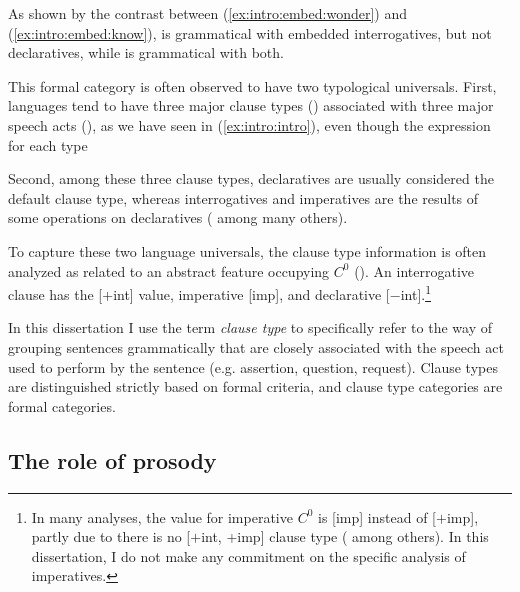 As shown by the contrast between (\ref{ex:intro:embed:wonder}) and (\ref{ex:intro:embed:know}),  is grammatical with embedded interrogatives, but not declaratives, while  is grammatical with both.



This formal category is often observed to have two typological universals. First, languages tend to have three major clause types (\diis{}) associated with three major speech acts (\aqrs{}), as we have seen in (\ref{ex:intro:intro}), even though the expression for each type 

Second, among these three clause types, declaratives are usually considered the default clause type, whereas interrogatives and imperatives are the results of some operations on declaratives (\cite{sz1985speechact, chomsky1957,chomsky1995minimalist, akmajian1984clausetype, platzack1997imp,rizzi1997} among many others). 



To capture these two language universals, the clause type information is often analyzed as related to an abstract feature occupying $C^{0}$ (\cite{chomsky1995minimalist, cheng1991, rizzi1997, rizzi2001int, chomskylasnik1977,platzack1997imp,akmajian1984clausetype, han1998imp}). An interrogative clause has the [+int] value, imperative [imp], and declarative [$-$int].\footnote{In many analyses, the value for imperative $C^{0}$ is [imp] instead of [$+$imp], partly due to there is no [$+$int, +imp] clause type (\cite{platzack1997imp,han1998imp} among others). In this dissertation, I do not make any commitment on the specific analysis of imperatives.} 



In this dissertation I use the term \emph{clause type} to specifically refer to the way of grouping sentences grammatically that are closely associated with the speech act used to perform by the sentence (e.g. assertion, question, request). Clause types are distinguished strictly based on formal criteria, and clause type categories are formal categories. 

\subsection{The role of prosody}
\label{sec:bg:theory:prosody}


